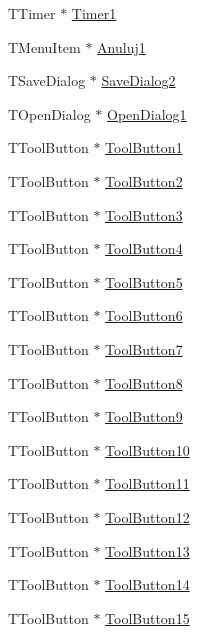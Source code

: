 \begin{CompactItemize}
\item 
TTimer $\ast$ \hyperlink{classTForm1_b485ef6199745c5c2982d8368ec9d1ff}{Timer1}
\item 
TMenuItem $\ast$ \hyperlink{classTForm1_70c2a2eb6c9f1bd59047ef27a073e515}{Anuluj1}
\item 
TSaveDialog $\ast$ \hyperlink{classTForm1_144e0a54931b8c3fdfcaa6ffbccd4bb8}{SaveDialog2}
\item 
TOpenDialog $\ast$ \hyperlink{classTForm1_355801e3a8dc885ec19da6b9a5c3aecf}{OpenDialog1}
\item 
TToolButton $\ast$ \hyperlink{classTForm1_16b516ed8315336626ef543084163b91}{ToolButton1}
\item 
TToolButton $\ast$ \hyperlink{classTForm1_28ac629b0279cc5d013d72add3ed41ce}{ToolButton2}
\item 
TToolButton $\ast$ \hyperlink{classTForm1_bc287a73f306ead728aa949a32876c0d}{ToolButton3}
\item 
TToolButton $\ast$ \hyperlink{classTForm1_8d7c119ff7216835783eff16f3672135}{ToolButton4}
\item 
TToolButton $\ast$ \hyperlink{classTForm1_239ab7cfcbf5e165d1dd4c29d6d06542}{ToolButton5}
\item 
TToolButton $\ast$ \hyperlink{classTForm1_f716972f3abf585457033528a9c3f03c}{ToolButton6}
\item 
TToolButton $\ast$ \hyperlink{classTForm1_ece2f6432ce9ba88a0de83283c7621d3}{ToolButton7}
\item 
TToolButton $\ast$ \hyperlink{classTForm1_77d558c092eb5fc084d253e4da0a02c7}{ToolButton8}
\item 
TToolButton $\ast$ \hyperlink{classTForm1_dab7a30ee8cee50b2e417c4c1bc5ec47}{ToolButton9}
\item 
TToolButton $\ast$ \hyperlink{classTForm1_3b3935ddfee9e1d21980a15a4cff512c}{ToolButton10}
\item 
TToolButton $\ast$ \hyperlink{classTForm1_878606b0648b29677e804bf2e2814ddd}{ToolButton11}
\item 
TToolButton $\ast$ \hyperlink{classTForm1_165b84429874244e7adafd6a40d544fb}{ToolButton12}
\item 
TToolButton $\ast$ \hyperlink{classTForm1_abbbbef41138d1af9106b37203916115}{ToolButton13}
\item 
TToolButton $\ast$ \hyperlink{classTForm1_7f5544c0484108b05d7804d18e537032}{ToolButton14}
\item 
TToolButton $\ast$ \hyperlink{classTForm1_640f6c6b44c7b4e93f800ddf9415240d}{ToolButton15}
\item 

\end{CompactItemize}
